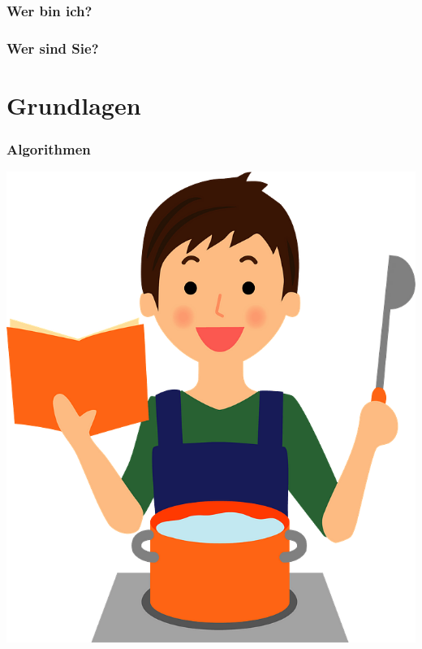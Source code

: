 \documentclass[aspectratio=169,xcolor=dvipsnames]{beamer}
\begin{document}
\begin{frame}
\frametitle{Wer bin ich?}
\end{frame}

\begin{frame}
\frametitle{Wer sind Sie?}
\end{frame}

\section{Grundlagen}

\begin{frame}
\frametitle{\glqq Algorithmen\grqq}
\begin{center}
\includegraphics[height=0.75\paperheight,keepaspectratio]{images/man-cooking-clipart} 
\end{center}
\end{frame}
\end{document}

